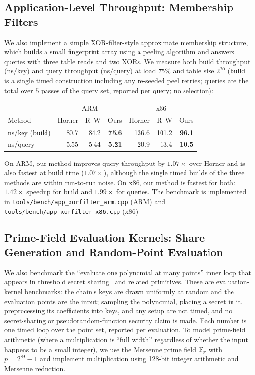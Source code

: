 \subsection{Application-Level Throughput: Membership Filters}
\label{sec:experiments:filter}

We also implement a simple XOR-filter-style approximate membership structure, which builds a
small fingerprint array using a peeling algorithm and answers queries with three table reads and
two XORs.
We measure both build throughput (ns/key) and query throughput (ns/query) at load $75\%$ and table
size $2^{20}$ (build is a single timed construction including any re-seeded
peel retries; queries are the total over $5$ passes of the query set,
reported per query; no selection):
\begin{center}
\begin{tabular}{l|rrr|rrr}
& \multicolumn{3}{c|}{ARM} & \multicolumn{3}{c}{x86} \\
Method & Horner & R--W & Ours & Horner & R--W & Ours \\
\hline
ns/key (build) & 80.7 & 84.2 & \textbf{75.6} & 136.6 & 101.2 & \textbf{96.1} \\
ns/query       & 5.55 & 5.44 & \textbf{5.21} & 20.9 & 13.4 & \textbf{10.5}
\end{tabular}
\end{center}
On ARM, our method improves query throughput by $1.07\times$ over Horner and is also fastest at build time
($1.07\times$), although the single timed builds of the three methods are within run-to-run noise.
On x86, our method is fastest for both: $1.42\times$ speedup for build and $1.99\times$ for queries.
The benchmark is implemented in \texttt{tools/bench/\allowbreak app\_xorfilter\_arm.cpp} (ARM) and
\texttt{tools/bench/\allowbreak app\_xorfilter\_x86.cpp} (x86).

\subsection{Prime-Field Evaluation Kernels: Share Generation and Random-Point Evaluation}
\label{sec:experiments:crypto}

We also benchmark the ``evaluate one polynomial at many points'' inner loop that
appears in threshold secret sharing~\cite{shamir1979share} and related primitives.
These are evaluation-kernel benchmarks: the chain's keys are drawn uniformly at
random and the evaluation points are the input; sampling the polynomial,
placing a secret in it, preprocessing its coefficients into keys, and any
setup are not timed, and no secret-sharing or pseudorandom-function security
claim is made.  Each number is one timed loop over the point set, reported
per evaluation.
To model prime-field arithmetic (where a multiplication is ``full width'' regardless of whether
the input happens to be a small integer), we use the Mersenne prime field
$\mathbb{F}_p$ with $p = 2^{89}-1$ and implement multiplication using 128-bit integer arithmetic and
Mersenne reduction.

